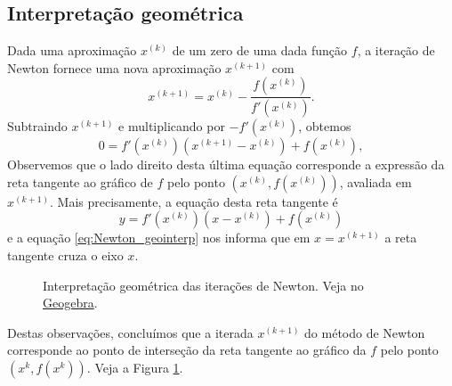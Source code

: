 \subsection{Interpretação geométrica}

Dada uma aproximação $x^{(k)}$ de um zero de uma dada função $f$, a iteração de Newton fornece uma nova aproximação $x^{(k+1)}$ com
\begin{equation}
  x^{(k+1)} = x^{(k)} - \frac{f(x^{(k)})}{f'(x^{(k)})}.
\end{equation}
Subtraindo $x^{(k+1)}$ e multiplicando por $-f'(x^{(k)})$, obtemos
\begin{equation}\label{eq:Newton_geointerp}
  0 = f'(x^{(k)})(x^{(k+1)}-x^{(k)}) + f(x^{(k)}),
\end{equation}
Observemos que o lado direito desta última equação corresponde a expressão da reta tangente ao gráfico de $f$ pelo ponto $(x^{(k)}, f(x^{(k)}))$, avaliada em $x^{(k+1)}$. Mais precisamente, a equação desta reta tangente é
\begin{equation}
  y = f'(x^{(k)})(x-x^{(k)}) + f(x^{(k)})
\end{equation}
e a equação \eqref{eq:Newton_geointerp} nos informa que em $x=x^{(k+1)}$ a reta tangente cruza o eixo $x$.

\begin{figure}[h!]
  \centering
  \caption{Interpretação geométrica das iterações de Newton. Veja no \href{https://github.com/phkonzen/notas/blob/master/src/MatematicaNumerica/cap_eq1d/dados/fig_Newton_geointerp/fig_Newton_geointerp.ggb}{Geogebra}.}
  \label{fig:Newton_geointerp}
\end{figure}


Destas observações, concluímos que a iterada $x^{(k+1)}$ do método de Newton corresponde ao ponto de interseção da reta tangente ao gráfico da $f$ pelo ponto $(x^{k}, f(x^{k}))$. Veja a Figura \ref{fig:Newton_geointerp}.

